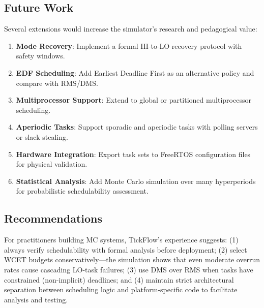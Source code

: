 \documentclass[conference]{IEEEtran}
\begin{document}
\subsection{Future Work}
Several extensions would increase the simulator's research and pedagogical value:
\begin{enumerate}
  \item \textbf{Mode Recovery}: Implement a formal HI-to-LO recovery protocol with safety windows.
  \item \textbf{EDF Scheduling}: Add Earliest Deadline First as an alternative policy and compare with RMS/DMS.
  \item \textbf{Multiprocessor Support}: Extend to global or partitioned multiprocessor scheduling.
  \item \textbf{Aperiodic Tasks}: Support sporadic and aperiodic tasks with polling servers or slack stealing.
  \item \textbf{Hardware Integration}: Export task sets to FreeRTOS configuration files for physical validation.
  \item \textbf{Statistical Analysis}: Add Monte Carlo simulation over many hyperperiods for probabilistic schedulability assessment.
\end{enumerate}

\subsection{Recommendations}
For practitioners building MC systems, TickFlow's experience suggests: (1) always verify schedulability with formal analysis before deployment; (2) select WCET budgets conservatively---the simulation shows that even moderate overrun rates cause cascading LO-task failures; (3) use DMS over RMS when tasks have constrained (non-implicit) deadlines; and (4) maintain strict architectural separation between scheduling logic and platform-specific code to facilitate analysis and testing.
\end{document}
